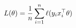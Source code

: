 \documentclass[preview]{standalone}
\begin{document}
\begin{align*}
\special{dvisvgm:raw <g id='unique000'>}L(\theta) = \frac{1}{n}\sum_{i=1}^n \ell(y_i x_i^\top \theta)\special{dvisvgm:raw </g>}
\end{align*}
\end{document}
